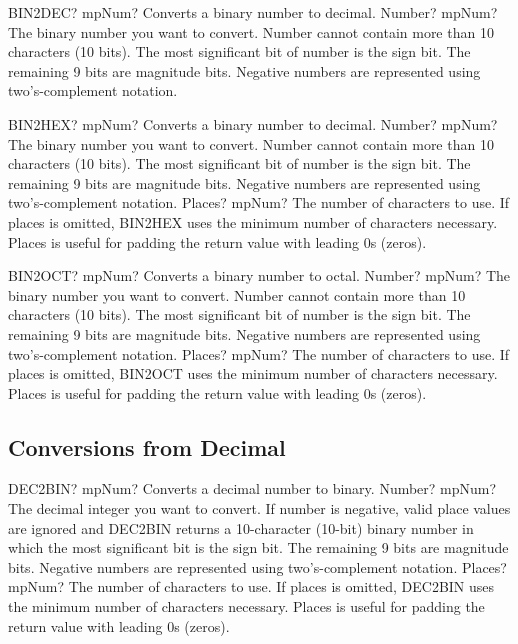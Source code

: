 \begin{mpFunctionsExtract}
	\mpWorksheetFunctionOneNotImplemented
	{BIN2DEC? mpNum? Converts a binary number to decimal.}
	{Number? mpNum? The binary number you want to convert. Number cannot contain more than 10 characters (10 bits). The most significant bit of number is the sign bit. The remaining 9 bits are magnitude bits. Negative numbers are represented using two's-complement notation.}
\end{mpFunctionsExtract}


\vspace{0.6cm}
\begin{mpFunctionsExtract}
	\mpWorksheetFunctionTwoNotImplemented
	{BIN2HEX? mpNum? Converts a binary number to decimal.}
	{Number? mpNum? The binary number you want to convert. Number cannot contain more than 10 characters (10 bits). The most significant bit of number is the sign bit. The remaining 9 bits are magnitude bits. Negative numbers are represented using two's-complement notation.}
	{Places? mpNum? The number of characters to use. If places is omitted, BIN2HEX uses the minimum number of characters necessary. Places is useful for padding the return value with leading 0s (zeros).}
\end{mpFunctionsExtract}


\vspace{0.6cm}
\begin{mpFunctionsExtract}
	\mpWorksheetFunctionTwoNotImplemented
	{BIN2OCT? mpNum? Converts a binary number to octal.}
	{Number? mpNum? The binary number you want to convert. Number cannot contain more than 10 characters (10 bits). The most significant bit of number is the sign bit. The remaining 9 bits are magnitude bits. Negative numbers are represented using two's-complement notation.}
	{Places? mpNum? The number of characters to use. If places is omitted, BIN2OCT uses the minimum number of characters necessary. Places is useful for padding the return value with leading 0s (zeros).}
\end{mpFunctionsExtract}



\subsection{Conversions from Decimal}


\begin{mpFunctionsExtract}
	\mpWorksheetFunctionTwoNotImplemented
	{DEC2BIN? mpNum? Converts a decimal number to binary.}
	{Number? mpNum? The decimal integer you want to convert. If number is negative, valid place values are ignored and DEC2BIN returns a 10-character (10-bit) binary number in which the most significant bit is the sign bit. The remaining 9 bits are magnitude bits. Negative numbers are represented using two's-complement notation.}
	{Places? mpNum? The number of characters to use. If places is omitted, DEC2BIN uses the minimum number of characters necessary. Places is useful for padding the return value with leading 0s (zeros).}
\end{mpFunctionsExtract}


